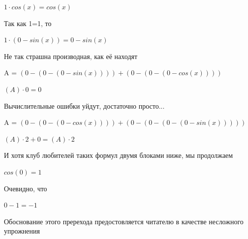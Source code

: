\documentclass[12pt,a4paper,fleqn]{article}
\begin{document}
\begin{center}
\begin{center}
\begin{center}
\begin{center}
\begin{center}
\begin{center}
\begin{center}
\begin{center}
\begin{center}
\begin{center}
\begin{center}
\begin{center}
\begin{center}
\begin{center}
\begin{center}
\begin{center}
\begin{center}
\begin{center}
\begin{center}
\begin{center}
\begin{center}
\begin{center}
\begin{center}
\begin{center}
\begin{center}
\begin{center}
\begin{center}
\begin{center}
\begin{center}
\begin{center}
\begin{center}
\begin{center}
\begin{center}
\begin{center}
\begin{center}
\begin{center}
\begin{center}
\begin{center}
\begin{center}
\begin{center}
\begin{center}
\begin{center}
\begin{center}
\begin{center}
\begin{center}
\begin{center}
\begin{center}
\begin{center}
\begin{center}
\begin{center}
\begin{center}
\begin{center}
\begin{center}
\begin{center}
\begin{center}
\begin{center}
$1 \cdot cos(x) = cos(x)$\end{center}
Так как 1=1, то\cite{link4}

\begin{center}
$1 \cdot (0-sin(x)) = 0-sin(x)$\end{center}
Не так страшна производная, как её находят\cite{link2}

\begin{center}
A = $(0-(0-(0-sin(x))))+(0-(0-(0-cos(x))))$\end{center}
\begin{center}
$(A) \cdot 0 = 0$\end{center}
Вычислительные ошибки уйдут, достаточно просто...

\begin{center}
A = $(0-(0-(0-cos(x))))+(0-(0-(0-(0-sin(x)))))$\end{center}
\begin{center}
$(A) \cdot 2+0 = (A) \cdot 2$\end{center}
И хотя клуб любителей таких формул двумя блоками ниже, мы продолжаем

\begin{center}
\begin{center}$cos(0) = 1$\end{center}
Очевидно, что

\begin{center}
\begin{center}$0-1 = -1$\end{center}
Обоснование этого пререхода предостовляется читателю в качестве несложного упрожнения


\end{center}
\end{center}
\end{center}
\end{center}
\end{center}
\end{center}
\end{center}
\end{center}
\end{center}
\end{center}
\end{center}
\end{center}
\end{center}
\end{center}
\end{center}
\end{center}
\end{center}
\end{center}
\end{center}
\end{center}
\end{center}
\end{center}
\end{center}
\end{center}
\end{center}
\end{center}
\end{center}
\end{center}
\end{center}
\end{center}
\end{center}
\end{center}
\end{center}
\end{center}
\end{center}
\end{center}
\end{center}
\end{center}
\end{center}
\end{center}
\end{center}
\end{center}
\end{center}
\end{center}
\end{center}
\end{center}
\end{center}
\end{center}
\end{center}
\end{center}
\end{center}
\end{center}
\end{center}
\end{center}
\end{center}
\end{center}
\end{center}
\end{document}
